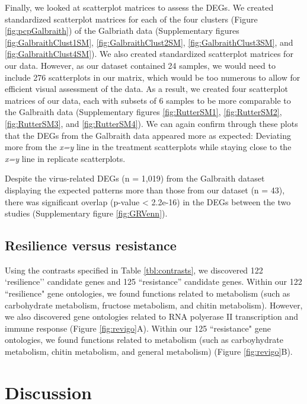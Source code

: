 \documentclass[11pt,a4paper,oldfontcommands,openany]{memoir}
\numberwithin{equation}{section} %
\begin{document}
Finally, we looked at scatterplot matrices to assess the DEGs. We created standardized scatterplot matrices for each of the four clusters (Figure \ref{fig:pcpGalbraith}) of the Galbriath data (Supplementary figures \ref{fig:GalbraithClust1SM}, \ref{fig:GalbraithClust2SM}, \ref{fig:GalbraithClust3SM}, and \ref{fig:GalbraithClust4SM}). We also created standardized scatterplot matrices for our data. However, as our dataset contained 24 samples, we would need to include 276 scatterplots in our matrix, which would be too numerous to allow for efficient visual assessment of the data. As a result, we created four scatterplot matrices of our data, each with subsets of 6 samples to be more comparable to the Galbraith data (Supplementary figures \ref{fig:RutterSM1}, \ref{fig:RutterSM2}, \ref{fig:RutterSM3}, and \ref{fig:RutterSM4}). We can again confirm through these plots that the DEGs from the Galbraith data appeared more as expected: Deviating more from the \textit{x=y} line in the treatment scatterplots while staying close to the \textit{x=y} line in replicate scatterplots.

Despite the virus-related DEGs (n = 1,019) from the Galbraith dataset displaying the expected patterns more than those from our dataset (n = 43), there was significant overlap (p-value < 2.2e-16) in the DEGs between the two studies (Supplementary figure \ref{fig:GRVenn}).

\subsection{Resilience versus resistance}

Using the contrasts specified in Table \ref{tbl:contrasts}, we discovered 122 `resilience'' candidate genes and 125 ``resistance'' candidate genes. Within our 122 ``resilience" gene ontologies, we found functions related to metabolism (such as carbohydrate metabolism, fructose metabolism, and chitin metabolism). However, we also discovered gene ontologies related to RNA polyerase II transcription and immune response (Figure \ref{fig:revigo}A). Within our 125 ``resistance" gene ontologies, we found functions related to metabolism (such as carboyhydrate metabolism, chitin metabolism, and general metabolism) (Figure \ref{fig:revigo}B). 

\section{Discussion}
\end{document}
